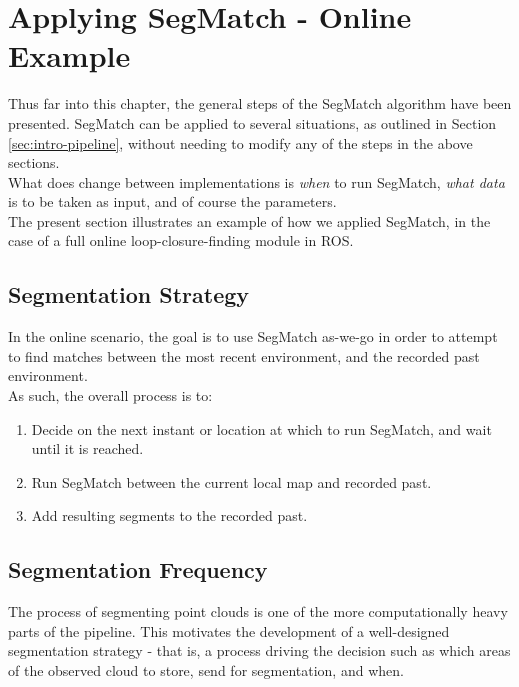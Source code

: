 \section{Applying SegMatch - Online Example}
\label{sec:online}

Thus far into this chapter, the general steps of the SegMatch algorithm have been presented. SegMatch can be applied to several situations, as outlined in Section \ref{sec:intro-pipeline}, without needing to modify any of the steps in the above sections.\\

What does change between implementations is \textit{when} to run SegMatch, \textit{what data} is to be taken as input, and of course the parameters.\\

The present section illustrates an example of how we applied SegMatch, in the case of a full online loop-closure-finding module in ROS.

\subsection{Segmentation Strategy}
\label{subsec:segmentation-strategy}

In the online scenario, the goal is to use SegMatch as-we-go in order to attempt to find matches between the most recent environment, and the recorded past environment.\\

As such, the overall process is to:   

\begin{enumerate}
\item Decide on the next instant or location at which to run SegMatch, and wait until it is reached.
\item Run SegMatch between the current local map and recorded past.
\item Add resulting segments to the recorded past.
\end{enumerate}

\subsection{Segmentation Frequency}
\label{subsec:segmentation-frequency}

The process of segmenting point clouds is one of the more computationally heavy parts of the pipeline. This motivates the development of a well-designed segmentation strategy - that is, a process driving the decision such as which areas of the observed cloud to store, send for segmentation, and when.\\

